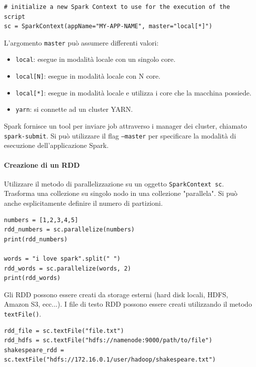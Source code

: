 \documentclass{article}
\begin{document}
\begin{appendices}
\begin{lstlisting}
# initialize a new Spark Context to use for the execution of the script
sc = SparkContext(appName="MY-APP-NAME", master="local[*]")
\end{lstlisting}
L'argomento \texttt{master} può assumere differenti valori:
\begin{itemize}
    \item \texttt{local}: esegue in modalità locale con un singolo core.
    \item \texttt{local[N]}: esegue in modalità locale con N core.
    \item \texttt{local[*]}: esegue in modalità locale e utilizza i core che la macchina possiede.
    \item \texttt{yarn}: si connette ad un cluster YARN.
\end{itemize}
Spark fornisce un tool per inviare job attraverso i manager dei cluster, chiamato \texttt{spark-submit}. Si può utilizzare il flag \texttt{--master} per specificare la modalità di esecuzione dell'applicazione Spark.
\paragraph{Creazione di un RDD}
Utilizzare il metodo di parallelizzazione su un oggetto \texttt{SparkContext sc}. Trasforma una collezione su singolo nodo in una collezione "parallela". Si può anche esplicitamente definire il numero di partizioni.
\begin{lstlisting}
numbers = [1,2,3,4,5]
rdd_numbers = sc.parallelize(numbers)
print(rdd_numbers)

words = "i love spark".split(" ")
rdd_words = sc.parallelize(words, 2)
print(rdd_words)
\end{lstlisting}
Gli RDD possono essere creati da storage esterni (hard disk locali, HDFS, Amazon S3, ecc...). I file di testo RDD possono essere creati utilizzando il metodo \texttt{textFile()}.
\begin{lstlisting}
rdd_file = sc.textFile("file.txt")
rdd_hdfs = sc.textFile("hdfs://namenode:9000/path/to/file")
shakespeare_rdd = sc.textFile("hdfs://172.16.0.1/user/hadoop/shakespeare.txt")
\end{lstlisting}


\end{appendices}
\end{document}
